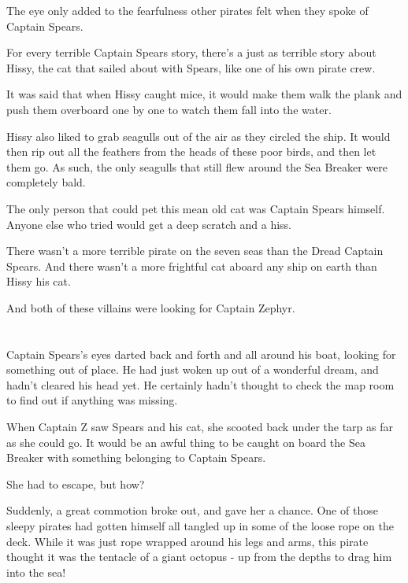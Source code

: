 \documentclass[12pt]{extbook}
\begin{document}
  The eye only added to the fearfulness other pirates felt when they spoke
  of Captain Spears.
  
  For every terrible Captain Spears story, there's a just as terrible
  story about Hissy, the cat that sailed about with Spears, like one of
  his own pirate crew.
  
  It was said that when Hissy caught mice, it would make them walk the
  plank and push them overboard one by one to watch them fall into the
  water.
  
  Hissy also liked to grab seagulls out of the air as they circled the
  ship. It would then rip out all the feathers from the heads of these
  poor birds, and then let them go. As such, the only seagulls that still
  flew around the Sea Breaker were completely bald.
  
  The only person that could pet this mean old cat was Captain Spears
  himself. Anyone else who tried would get a deep scratch and a hiss.
  
  There wasn't a more terrible pirate on the seven seas than the Dread
  Captain Spears. And there wasn't a more frightful cat aboard any ship on
  earth than Hissy his cat.
  
  And both of these villains were looking for Captain Zephyr.
  
  \section{}\label{section-6}
  
  Captain Spears's eyes darted back and forth and all around his boat,
  looking for something out of place. He had just woken up out of a
  wonderful dream, and hadn't cleared his head yet. He certainly hadn't
  thought to check the map room to find out if anything was missing.
  
  When Captain Z saw Spears and his cat, she scooted back under the tarp
  as far as she could go. It would be an awful thing to be caught on board
  the Sea Breaker with something belonging to Captain Spears.
  
  She had to escape, but how?
  
  Suddenly, a great commotion broke out, and gave her a chance. One of
  those sleepy pirates had gotten himself all tangled up in some of the
  loose rope on the deck. While it was just rope wrapped around his legs
  and arms, this pirate thought it was the tentacle of a giant octopus -
  up from the depths to drag him into the sea!
  
\end{document}
